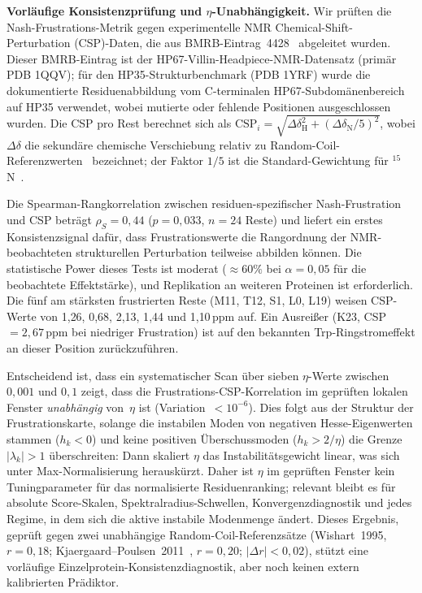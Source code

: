 \documentclass[12pt,a4paper]{article}
\theoremstyle{remark}
\begin{document}
\textbf{Vorläufige Konsistenzprüfung und $\eta$-Unabhängigkeit.}
Wir prüften die Nash-Frustrations-Metrik gegen experimentelle NMR Chemical-Shift-Perturbation (CSP)-Daten, die aus BMRB-Eintrag~4428~\cite{BMRB4428} abgeleitet wurden. Dieser BMRB-Eintrag ist der HP67-Villin-Headpiece-NMR-Datensatz (primär PDB 1QQV); für den HP35-Strukturbenchmark (PDB 1YRF) wurde die dokumentierte Residuenabbildung vom C-terminalen HP67-Subdomänenbereich auf HP35 verwendet, wobei mutierte oder fehlende Positionen ausgeschlossen wurden. Die CSP pro Rest berechnet sich als $\text{CSP}_i = \sqrt{\Delta\delta_{\text{H}}^2 + (\Delta\delta_{\text{N}}/5)^2}$, wobei $\Delta\delta$ die sekundäre chemische Verschiebung relativ zu Random-Coil-Referenzwerten~\cite{Wishart1995} bezeichnet; der Faktor $1/5$ ist die Standard-Gewichtung für ${}^{15}$N~\cite{Williamson2013}.

Die Spearman-Rangkorrelation zwischen residuen-spezifischer Nash-Frustration und CSP beträgt $\rho_S = 0{,}44$ ($p = 0{,}033$, $n = 24$ Reste) und liefert ein erstes Konsistenzsignal dafür, dass Frustrationswerte die Rangordnung der NMR-beobachteten strukturellen Perturbation teilweise abbilden können. Die statistische Power dieses Tests ist moderat ($\approx 60\%$ bei $\alpha = 0{,}05$ für die beobachtete Effektstärke), und Replikation an weiteren Proteinen ist erforderlich. Die fünf am stärksten frustrierten Reste (M11, T12, S1, L0, L19) weisen CSP-Werte von 1{,}26, 0{,}68, 2{,}13, 1{,}44 und 1{,}10\,ppm auf. Ein Ausreißer (K23, CSP~$= 2{,}67$\,ppm bei niedriger Frustration) ist auf den bekannten Trp-Ringstromeffekt an dieser Position zurückzuführen.

Entscheidend ist, dass ein systematischer Scan über sieben $\eta$-Werte zwischen $0{,}001$ und $0{,}1$ zeigt, dass die Frustrations-CSP-Korrelation im geprüften lokalen Fenster \emph{unabhängig} von~$\eta$ ist (Variation~$< 10^{-6}$). Dies folgt aus der Struktur der Frustrationskarte, solange die instabilen Moden von negativen Hesse-Eigenwerten stammen ($h_k<0$) und keine positiven Überschussmoden ($h_k>2/\eta$) die Grenze $|\lambda_k|>1$ überschreiten: Dann skaliert $\eta$ das Instabilitätsgewicht linear, was sich unter Max-Normalisierung herauskürzt. Daher ist $\eta$ im geprüften Fenster kein Tuningparameter für das normalisierte Residuenranking; relevant bleibt es für absolute Score-Skalen, Spektralradius-Schwellen, Konvergenzdiagnostik und jedes Regime, in dem sich die aktive instabile Modenmenge ändert. Dieses Ergebnis, geprüft gegen zwei unabhängige Random-Coil-Referenzsätze (Wishart~1995, $r = 0{,}18$; Kjaergaard--Poulsen~2011~\cite{KjaergaardPoulsen2011}, $r = 0{,}20$; $|\Delta r| < 0{,}02$), stützt eine vorläufige Einzelprotein-Konsistenzdiagnostik, aber noch keinen extern kalibrierten Prädiktor.
\end{document}
